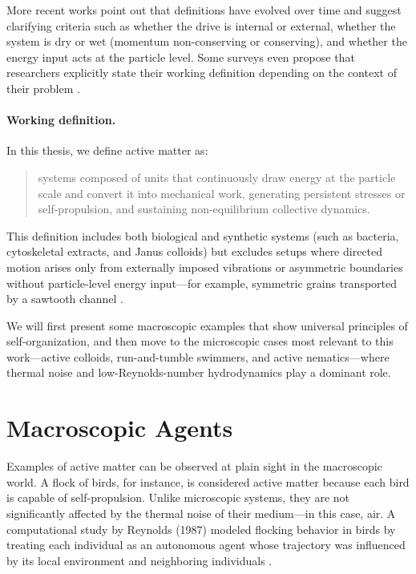 More recent works point out that definitions have evolved over time and suggest clarifying criteria such as whether the drive is internal or external, whether the system is dry or wet (momentum non-conserving or conserving), and whether the energy input acts at the particle level. Some surveys even propose that researchers explicitly state their working definition depending on the context of their problem \cite{gompper20202020, gompper20252025}.

\paragraph{Working definition.} In this thesis, we define active matter as:
\begin{quote}
systems composed of units that continuously draw energy at the particle scale and convert it into mechanical work, generating persistent stresses or self-propulsion, and sustaining non-equilibrium collective dynamics.
\end{quote}

This definition includes both biological and synthetic systems (such as bacteria, cytoskeletal extracts, and Janus colloids) but excludes setups where directed motion arises only from externally imposed vibrations or asymmetric boundaries without particle-level energy input—for example, symmetric grains transported by a sawtooth channel \cite{reimann2002brownian, hanggi2009artificial}.



We will first present some macroscopic examples that show universal principles of self-organization, and then move to the microscopic cases most relevant to this work—active colloids, run-and-tumble swimmers, and active nematics—where thermal noise and low-Reynolds-number hydrodynamics play a dominant role.


\section{Macroscopic Agents}

Examples of active matter can be observed at plain sight in the macroscopic world. A flock of birds, for instance, is considered active matter because each bird is capable of self-propulsion. Unlike microscopic systems, they are not significantly affected by the thermal noise of their medium—in this case, air. A computational study by Reynolds (1987) modeled flocking behavior in birds by treating each individual as an autonomous agent whose trajectory was influenced by its local environment and neighboring individuals \cite{reynolds1987flocks}.

